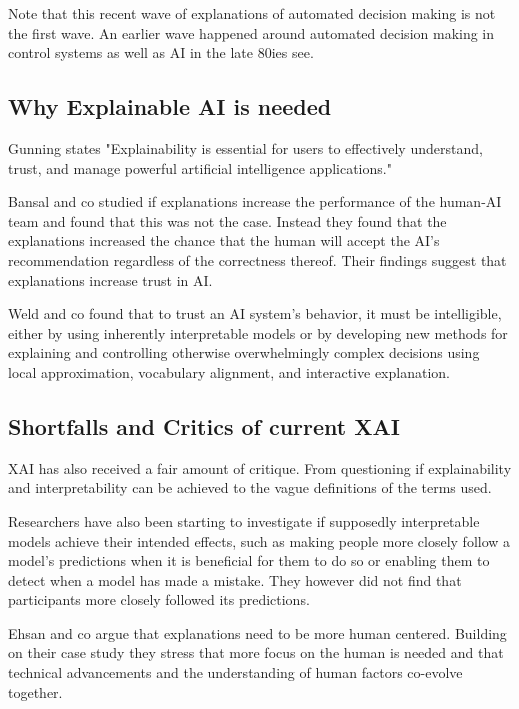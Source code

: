 \documentclass[manuscript,screen,review]{acmart}
\begin{document}
Note that this recent wave of explanations of automated decision making is not the first wave.
An earlier wave happened around automated decision making in control systems as well as AI in the late 80ies see\cite{Chandrasekaran1989}.

\subsection{Why Explainable AI is needed}\label{subsec:why-explainable-ai-is-needed}
Gunning states "Explainability is essential for users to effectively understand, trust, and manage powerful artificial intelligence applications."\cite{Gunning2019}

Bansal and co studied if explanations increase the performance of the human-AI team and found that this was not the case.
Instead they found that the explanations increased the chance that the human will accept the AI's recommendation regardless of
the correctness thereof.
Their findings suggest that explanations increase trust in AI\cite{Bansal2020}.

Weld and co found that to trust an AI system's behavior, it must be intelligible, either by using inherently interpretable models or by developing new methods for explaining and controlling otherwise overwhelmingly complex decisions using local approximation, vocabulary alignment, and interactive explanation\cite{Weld2019}.


\subsection{Shortfalls and Critics of current XAI}\label{subsec:shortfalls-and-critics-of-current-xai}
XAI has also received a fair amount of critique.
From questioning if explainability and interpretability can be achieved to the vague definitions of the terms used\cite{Lipton2018}.

Researchers have also been starting to investigate if supposedly interpretable models achieve their intended effects, such as making people more closely follow a model's predictions when it is beneficial for them to do so or enabling them to detect when a model has made a mistake.
They however did not find that participants more closely followed its predictions\cite{Goldstein2021}.

Ehsan and co argue that explanations need to be more human centered.
Building on their case study they stress that more focus on the human is needed and that technical advancements and the understanding of human factors co-evolve together.\cite{Ehsan2020}
\end{document}
